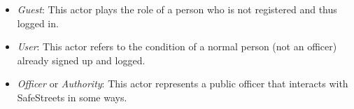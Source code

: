 \begin{itemize}
	\item \textit{Guest}: This actor plays the role of a person who is not registered and thus logged in.
	\item \textit{User}: This actor refers to the condition of a normal person (not an officer) already signed up and logged.
	\item \textit{Officer} or \textit{Authority}: This actor represents a public officer that interacts with SafeStreets in some ways.
\end{itemize}